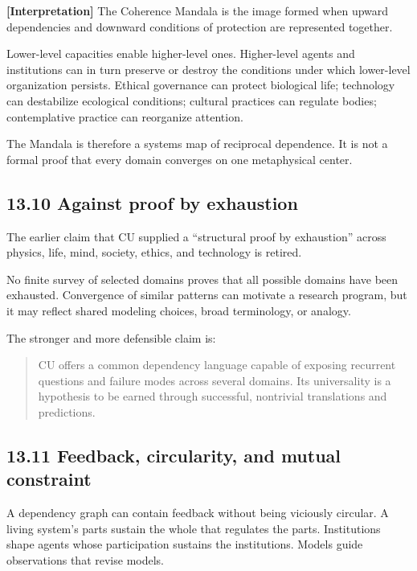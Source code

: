 \documentclass[
  11pt,
]{article}
\begin{document}
\textbf{{[}Interpretation{]}} The Coherence Mandala is the image formed
when upward dependencies and downward conditions of protection are
represented together.

Lower-level capacities enable higher-level ones. Higher-level agents and
institutions can in turn preserve or destroy the conditions under which
lower-level organization persists. Ethical governance can protect
biological life; technology can destabilize ecological conditions;
cultural practices can regulate bodies; contemplative practice can
reorganize attention.

The Mandala is therefore a systems map of reciprocal dependence. It is
not a formal proof that every domain converges on one metaphysical
center.

\subsection{13.10 Against proof by
exhaustion}\label{against-proof-by-exhaustion}

The earlier claim that CU supplied a ``structural proof by exhaustion''
across physics, life, mind, society, ethics, and technology is retired.

No finite survey of selected domains proves that all possible domains
have been exhausted. Convergence of similar patterns can motivate a
research program, but it may reflect shared modeling choices, broad
terminology, or analogy.

The stronger and more defensible claim is:

\begin{quote}
CU offers a common dependency language capable of exposing recurrent
questions and failure modes across several domains. Its universality is
a hypothesis to be earned through successful, nontrivial translations
and predictions.
\end{quote}

\subsection{13.11 Feedback, circularity, and mutual
constraint}\label{feedback-circularity-and-mutual-constraint}

A dependency graph can contain feedback without being viciously
circular. A living system's parts sustain the whole that regulates the
parts. Institutions shape agents whose participation sustains the
institutions. Models guide observations that revise models.
\end{document}
